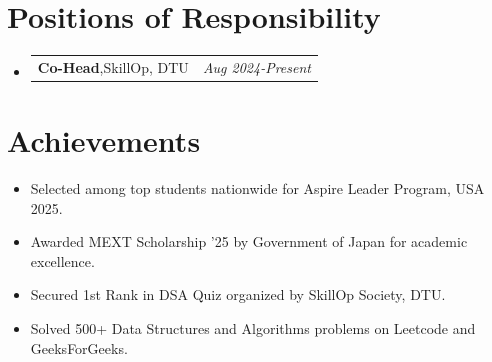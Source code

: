 \documentclass[a4paper,12pt]{article}
\makeatletter
\newcommand{\resumePOR}[3]{
\vspace{0.5mm}\item
    \begin{tabular*}{0.97\textwidth}[t]{l@{\extracolsep{\fill}}r}
        \textbf{#1},\hspace{0.3mm}#2 & \textit{\small{#3}} 
    \end{tabular*}
    \vspace{-2mm}
}
\newcommand{\resumeSubheading}[4]{
\vspace{0.5mm}\item
    \begin{tabular*}{0.98\textwidth}[t]{l@{\extracolsep{\fill}}r}
        \textbf{#1} & \textit{\footnotesize{#4}} \\
        \textit{\footnotesize{#3}} &  \footnotesize{#2}\\
    \end{tabular*}
    \vspace{-2.4mm}
}
\newcommand{\resumeSubHeadingListStart}{\begin{itemize}[leftmargin=*,labelsep=0mm]}
\newcommand{\resumeItemListStart}{\begin{justify}\begin{itemize}[leftmargin=3ex, rightmargin=2ex, noitemsep,labelsep=1.2mm,itemsep=0mm]\small}
\newcommand{\resumeSubHeadingListEnd}{\end{itemize}\vspace{2mm}}
\newcommand{\resumeItemListEnd}{\end{itemize}\end{justify}\vspace{-2mm}}
\makeatother
\begin{document}

\section{\textbf{Positions of Responsibility}}
\vspace{-0.4mm}
\resumeSubHeadingListStart

\resumePOR
{Co-Head}
{SkillOp, DTU}
{Aug 2024-Present}

\resumeSubHeadingListEnd
\vspace{-4mm}

\section{\textbf{Achievements}}
\vspace{-0.1mm}
\resumeItemListStart
\item Selected among top students nationwide for Aspire Leader Program, USA 2025.
\item Awarded MEXT Scholarship '25 by Government of Japan for academic excellence.
\item Secured 1st Rank in DSA Quiz organized by SkillOp Society, DTU.
\item Solved 500+ Data Structures and Algorithms problems on Leetcode and GeeksForGeeks.
\resumeItemListEnd

\end{document}
